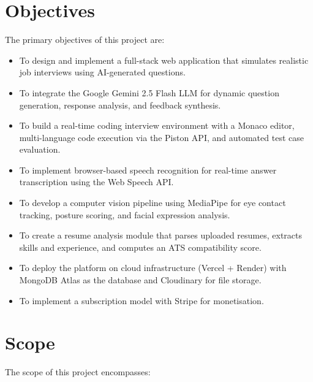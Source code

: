 \section{Objectives}

The primary objectives of this project are:

\begin{itemize}
    \item To design and implement a full-stack web application that simulates realistic job interviews using AI-generated questions.
    \item To integrate the Google Gemini 2.5 Flash LLM for dynamic question generation, response analysis, and feedback synthesis.
    \item To build a real-time coding interview environment with a Monaco editor, multi-language code execution via the Piston API, and automated test case evaluation.
    \item To implement browser-based speech recognition for real-time answer transcription using the Web Speech API.
    \item To develop a computer vision pipeline using MediaPipe for eye contact tracking, posture scoring, and facial expression analysis.
    \item To create a resume analysis module that parses uploaded resumes, extracts skills and experience, and computes an ATS compatibility score.
    \item To deploy the platform on cloud infrastructure (Vercel + Render) with MongoDB Atlas as the database and Cloudinary for file storage.
    \item To implement a subscription model with Stripe for monetisation.
\end{itemize}

\section{Scope}

The scope of this project encompasses:

